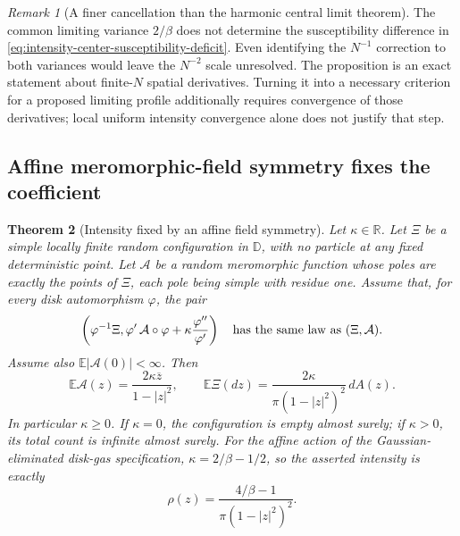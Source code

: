 \documentclass[11pt,a4paper]{article}
\numberwithin{equation}{section}
\newtheorem{theorem}{Theorem}[section]
\theoremstyle{definition}
\theoremstyle{remark}
\newtheorem{remark}[theorem]{Remark}
\newcommand{\D}{\mathbb D}
\newcommand{\E}{\mathbb E}
\newcommand{\R}{\mathbb R}
\begin{document}
\begin{remark}[A finer cancellation than the harmonic central limit theorem]
The common limiting variance $2/\beta$ does not determine the
susceptibility difference in
\eqref{eq:intensity-center-susceptibility-deficit}. Even identifying
the $N^{-1}$ correction to both variances would leave the
$N^{-2}$ scale unresolved. The proposition is an exact statement
about finite-$N$ spatial derivatives. Turning it into a necessary
criterion for a proposed limiting profile additionally requires
convergence of those derivatives; local uniform intensity
convergence alone does not justify that step.
\end{remark}

\subsection{Affine meromorphic-field symmetry fixes the coefficient}

\begin{theorem}[Intensity fixed by an affine field symmetry]
\label{thm:affine-meromorphic-field-intensity}
Let $\kappa\in\R$. Let $\Xi$ be a simple locally finite random
configuration in $\D$, with no particle at any fixed deterministic
point. Let $\mathcal A$ be a random meromorphic function whose poles
are exactly the points of $\Xi$, each pole being simple with residue
one. Assume that, for every disk automorphism $\varphi$, the pair
\begin{equation}
 \left(\varphi^{-1}\Xi,
       \varphi'\,\mathcal A\circ\varphi
             +\kappa\frac{\varphi''}{\varphi'}\right)
 \quad\hbox{has the same law as }(\Xi,\mathcal A).
 \label{eq:affine-meromorphic-field-stationarity}
\end{equation}
Assume also $\E|\mathcal A(0)|<\infty$. Then
\begin{equation}
 \E\mathcal A(z)=\frac{2\kappa\overline z}{1-|z|^2},
 \qquad
 \E\Xi(dz)=\frac{2\kappa}{\pi(1-|z|^2)^2}\,dA(z).
 \label{eq:affine-meromorphic-exact-intensity}
\end{equation}
In particular $\kappa\ge0$. If $\kappa=0$, the configuration is
empty almost surely; if $\kappa>0$, its total count is infinite
almost surely. For the affine action of the Gaussian-eliminated disk-gas
specification, $\kappa=2/\beta-1/2$, so the asserted intensity is
exactly
\[
 \rho(z)=\frac{4/\beta-1}{\pi(1-|z|^2)^2}.
\]
\end{theorem}
\end{document}
